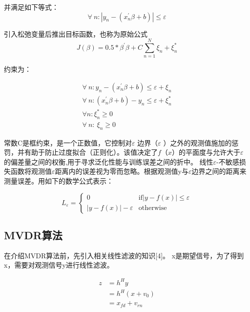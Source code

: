 并满足如下等式：
\begin{equation}
\forall\ n:\left|y_n-\left(x_n^\prime\beta+b\right)\right|\le\varepsilon
\end{equation}

引入松弛变量后推出目标函数，也称为原始公式
\begin{equation}
J\left(\beta\right)=0.5\ast\beta^\prime\beta+C\sum_{n=1}^{N}{\xi_n+\xi_n^\ast}
\end{equation}

约束为：

\begin{equation}
\begin{gathered}
\forall\ n:y_n-\left(x_n^\prime\beta+b\right)\le\varepsilon+\xi_n\\
\forall\ n:\left(x_n^\prime\beta+b\right)-y_n\le\varepsilon+\xi_n^\ast\\
{\forall n:\xi}_n^\ast\geq0\\
\forall\ n:\ \xi_n\geq0
\end{gathered}
\end{equation}

常数C是框约束，是一个正数值，它控制对$\varepsilon$ 边界（$\varepsilon$ ）之外的观测值施加的惩罚，并有助于防止过度拟合（正则化）。该值决定了$f（x）$的平面度与允许大于$\varepsilon$的偏差量之间的权衡,用于寻求泛化性能与训练误差之间的折中。
线性$\varepsilon$-不敏感损失函数将观测值$\varepsilon$距离内的误差视为零而忽略。根据观测值y与$\varepsilon$边界之间的距离来测量误差。用如下的数学公式表示：

\begin{equation}
L_\varepsilon= 
\begin{cases}
0&               \text{if} |y-f(x)|\leq \varepsilon\\
|y-f(x)|-\varepsilon&       \text{otherwise}
\end{cases}
\end{equation}

\subsection{MVDR算法}
在介绍MVDR算法前，先引入相关线性滤波的知识[4]。
x是期望信号，为了得到x，需要对观测信号y进行线性滤波。

\begin{equation}
\begin{aligned}
z&=h^Hy\\
&= h^H\left(x+v_0\right)\\
&=x_{fd}+v_{rn}
\end{aligned}
\end{equation}

